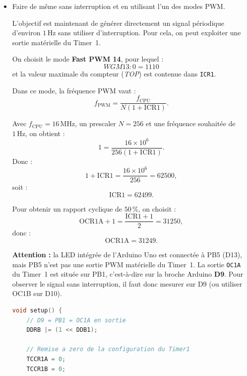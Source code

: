 \documentclass[a4paper,11pt]{article}
\begin{document}
\begin{itemize}
    \item Faire de même sans interruption et en utilisant l'un des modes PWM.
    \begin{solution}
        L'objectif est maintenant de générer directement un signal périodique
        d'environ \(1\,\mathrm{Hz}\) sans utiliser d'interruption. Pour cela,
        on peut exploiter une sortie matérielle du Timer~1.

        \medskip
        On choisit le mode \textbf{Fast PWM 14}, pour lequel :
        \[
            WGM13:0 = 1110
        \]
        et la valeur maximale du compteur (\textit{TOP}) est contenue dans
        \texttt{ICR1}.

        Dans ce mode, la fréquence PWM vaut :
        \[
            f_{\mathrm{PWM}}
            =
            \frac{f_{\mathrm{CPU}}}
                 {N\left(1+\mathrm{ICR1}\right)}.
        \]

        Avec \(f_{\mathrm{CPU}}=16\,\mathrm{MHz}\), un prescaler
        \(N=256\) et une fréquence souhaitée de \(1\,\mathrm{Hz}\), on obtient :
        \[
            1
            =
            \frac{16\times10^6}
                 {256\left(1+\mathrm{ICR1}\right)}.
        \]
        Donc :
        \[
            1+\mathrm{ICR1}
            =
            \frac{16\times10^6}{256}
            =
            62500,
        \]
        soit :
        \[
            \boxed{\mathrm{ICR1}=62499}.
        \]

        Pour obtenir un rapport cyclique de \(50\,\%\), on choisit :
        \[
            \mathrm{OCR1A}+1
            =
            \frac{\mathrm{ICR1}+1}{2}
            =
            31250,
        \]
        donc :
        \[
            \boxed{\mathrm{OCR1A}=31249}.
        \]

        \textbf{Attention :} la LED intégrée de l'Arduino Uno est connectée à
        PB5 (D13), mais PB5 n'est pas une sortie PWM matérielle du Timer~1.
        La sortie \texttt{OC1A} du Timer~1 est située sur PB1, c'est-à-dire sur
        la broche Arduino \textbf{D9}. Pour observer le signal sans
        interruption, il faut donc mesurer sur D9 (ou utiliser OC1B sur D10).
        \end{solution}
        \begin{solution}
        
        \begin{lstlisting}[language=C++]
void setup() {
    // D9 = PB1 = OC1A en sortie
    DDRB |= (1 << DDB1);

    // Remise a zero de la configuration du Timer1
    TCCR1A = 0;
    TCCR1B = 0;


\end{lstlisting}
\end{solution}
\end{itemize}
\end{document}
